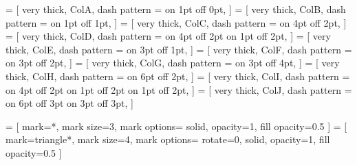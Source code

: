 \def\sympathA{optimal-import-petro-layer-260514-14h05m22s}
\def\sympathB{optimal-import-petro-layer-blob-260514-14h05m28s}
\def\sympathC{optimal-import-petro-layer-layer-diag-260514-14h05m36s}
\def\sympathD{optimal-import-petro-layer-layer-column-260514-14h05m32s}
\def\sympathE{optimal-import-petro-layer-bracket-260514-14h05m43s}
\def\sympathF{optimal-import-petro-surround-260514-14h05m24s}
\def\sympathG{optimal-import-petro-layer-scolumn-layer-260514-14h05m40s}
\def\sympathH{optimal-import-petro-layer-layer-scolumn-260514-14h05m38s}
\def\sympathI{optimal-import-petro-semi-surround-260514-14h05m42s}
\def\sympathJ{optimal-import-petro-layer-cap-260514-14h05m45s}


\def\|{\text{\textbar}}

 = [
very thick, ColA, dash pattern = {on 1pt off 0pt},
]
 = [
very thick, ColB, dash pattern = {on 1pt off 1pt},
]
 = [
very thick, ColC, dash pattern = {on 4pt off 2pt},
]
 = [
very thick, ColD, dash pattern = {on 4pt off 2pt on 1pt off 2pt},
]
 = [
very thick, ColE, dash pattern = {on 3pt off 1pt},
]
 = [
very thick, ColF, dash pattern = {on 3pt off 2pt},
]
 = [
very thick, ColG, dash pattern = {on 3pt off 4pt},
]
 = [
very thick, ColH, dash pattern = {on 6pt off 2pt},
]
 = [
very thick, ColI, dash pattern = {on 4pt off 2pt on 1pt off 2pt on 1pt off 2pt},
]
 = [
very thick, ColJ, dash pattern = {on 6pt off 3pt on 3pt off 3pt},
]

 = [
	mark=*, mark size=3, mark options={
		solid,
		opacity=1,
		fill opacity=0.5
	}
]
 = [
	mark=triangle*, mark size=4, mark options={
		rotate=0,
		solid,
		opacity=1,
		fill opacity=0.5
	}	
]

